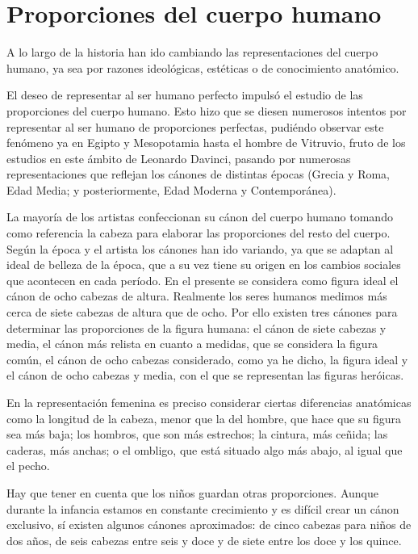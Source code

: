 \section{Proporciones del cuerpo humano} %
A lo largo de la historia han ido cambiando las representaciones del cuerpo humano, ya sea por razones ideológicas, estéticas o de conocimiento anatómico.

El deseo de representar al ser humano perfecto impulsó el estudio de las proporciones del cuerpo humano. Esto hizo que se diesen numerosos intentos por representar al ser humano de proporciones perfectas, pudiéndo observar este fenómeno ya en Egipto y Mesopotamia hasta el hombre de Vitruvio, fruto de los estudios en este ámbito de Leonardo Davinci, pasando por numerosas representaciones que reflejan los cánones de distintas épocas (Grecia y Roma, Edad Media; y posteriormente, Edad Moderna y Contemporánea).


La mayoría de los artistas confeccionan su cánon del cuerpo humano tomando como referencia la cabeza para elaborar las proporciones del resto del cuerpo.
Según la época y el artista los cánones han ido variando, ya que se adaptan al ideal de belleza de la época, que a su vez tiene su origen en los cambios sociales que acontecen en cada período. En el presente se considera como figura ideal el cánon de ocho cabezas de altura. Realmente los seres humanos medimos más cerca de siete cabezas de altura que de ocho. Por ello existen tres cánones para determinar las proporciones de la figura humana: el cánon de siete cabezas y media, el cánon más relista en cuanto a medidas, que se considera la figura común, el cánon de ocho cabezas considerado, como ya he dicho, la figura ideal y el cánon de ocho cabezas y media, con el que se representan las figuras heróicas.

En la representación femenina es preciso considerar ciertas diferencias anatómicas como la longitud de la cabeza, menor que la del hombre, que hace que su figura sea más baja; los hombros, que son más estrechos; la cintura, más ceñida; las caderas, más anchas; o el ombligo, que está situado algo más abajo, al igual que el pecho.

Hay que tener en cuenta que los niños guardan otras proporciones. Aunque durante la infancia estamos en constante crecimiento y es difícil crear un cánon exclusivo, sí existen algunos cánones aproximados: de cinco cabezas para niños de dos años, de seis cabezas entre seis y doce y de siete entre los doce y los quince.

